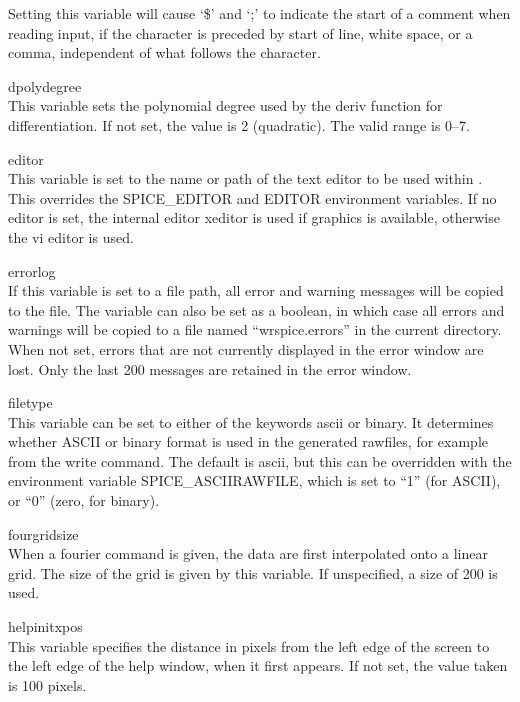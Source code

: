 \begin{description}
Setting this variable will cause `{\vt \$}' and `{\vt ;}' to indicate
the start of a comment when reading input, if the character is
preceded by start of line, white space, or a comma, independent of
what follows the character.

\item{\et dpolydegree}\\
This variable sets the polynomial degree used by the {\vt deriv}
function for differentiation.  If not set, the value is 2 (quadratic). 
The valid range is 0--7.

\item{\et editor}\\
This variable is set to the name or path of the text editor to be used
within {\WRspice}.  This overrides the {\et SPICE\_EDITOR} and {\et
EDITOR} environment variables.  If no editor is set, the internal
editor {\cb xeditor} is used if graphics is available, otherwise the
{\vt vi} editor is used.

\item{\et errorlog}\\
If this variable is set to a file path, all error and warning messages
will be copied to the file.  The variable can also be set as a
boolean, in which case all errors and warnings will be copied to a
file named ``{\vt wrspice.errors}'' in the current directory.  When
not set, errors that are not currently displayed in the error window
are lost.  Only the last 200 messages are retained in the error
window.

\item{\et filetype}\\
This variable can be set to either of the keywords {\vt ascii} or {\vt
binary}.  It determines whether ASCII or binary format is used in the
generated rawfiles, for example from the {\cb write} command.  The
default is {\vt ascii}, but this can be overridden with the
environment variable {\et SPICE\_ASCIIRAWFILE}, which is set to ``1''
(for ASCII), or ``0'' (zero, for binary).

\item{\et fourgridsize}\\
When a {\cb fourier} command is given, the data are first interpolated
onto a linear grid.  The size of the grid is given by this variable. 
If unspecified, a size of 200 is used.

\item{\et helpinitxpos}\\
This variable specifies the distance in pixels from the left edge of
the screen to the left edge of the help window, when it first appears. 
If not set, the value taken is 100 pixels.


\end{description}
